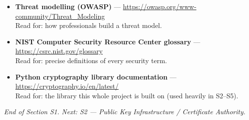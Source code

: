 \documentclass[11pt,a4paper]{article}
\begin{document}
\begin{itemize}
        Read for: why ephemeral keys protect past sessions.
  \item \textbf{Threat modelling (OWASP)} ---
        \url{https://owasp.org/www-community/Threat_Modeling}\\
        Read for: how professionals build a threat model.
  \item \textbf{NIST Computer Security Resource Center glossary} ---
        \url{https://csrc.nist.gov/glossary}\\
        Read for: precise definitions of every security term.
  \item \textbf{Python cryptography library documentation} ---
        \url{https://cryptography.io/en/latest/}\\
        Read for: the library this whole project is built on (used heavily in S2--S5).
\end{itemize}

\vfill
\begin{center}\footnotesize\itshape
End of Section S1. Next: S2 --- Public Key Infrastructure / Certificate Authority.
\end{center}
\end{document}
